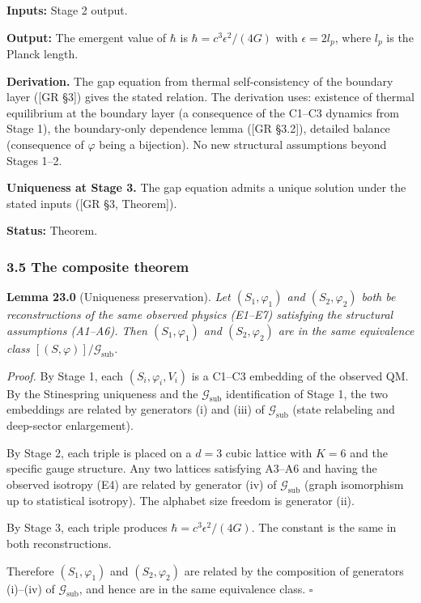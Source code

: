 \documentclass[
]{article}
\begin{document}
\textbf{Inputs:} Stage 2 output.

\textbf{Output:} The emergent value of \(\hbar\) is
\(\hbar = c^3 \epsilon^2 / (4G)\) with \(\epsilon = 2 l_p\), where
\(l_p\) is the Planck length.

\textbf{Derivation.} The gap equation from thermal self-consistency of
the boundary layer ({[}GR §3{]}) gives the stated relation. The
derivation uses: existence of thermal equilibrium at the boundary layer
(a consequence of the C1--C3 dynamics from Stage 1), the boundary-only
dependence lemma ({[}GR §3.2{]}), detailed balance (consequence of
\(\varphi\) being a bijection). No new structural assumptions beyond
Stages 1--2.

\textbf{Uniqueness at Stage 3.} The gap equation admits a unique
solution under the stated inputs ({[}GR §3, Theorem{]}).

\textbf{Status:} Theorem.

\hypertarget{the-composite-theorem}{%
\subsubsection{3.5 The composite theorem}\label{the-composite-theorem}}

\textbf{Lemma 23.0} (Uniqueness preservation). \emph{Let
\((S_1, \varphi_1)\) and \((S_2, \varphi_2)\) both be reconstructions of
the same observed physics (E1--E7) satisfying the structural assumptions
(A1--A6). Then \((S_1, \varphi_1)\) and \((S_2, \varphi_2)\) are in the
same equivalence class \([(S, \varphi)]/\mathcal{G}_{\text{sub}}\).}

\emph{Proof.} By Stage 1, each \((S_i, \varphi_i, V_i)\) is a C1--C3
embedding of the observed QM. By the Stinespring uniqueness and the
\(\mathcal{G}_{\text{sub}}\) identification of Stage 1, the two
embeddings are related by generators (i) and (iii) of
\(\mathcal{G}_{\text{sub}}\) (state relabeling and deep-sector
enlargement).

By Stage 2, each triple is placed on a \(d = 3\) cubic lattice with
\(K = 6\) and the specific gauge structure. Any two lattices satisfying
A3--A6 and having the observed isotropy (E4) are related by generator
(iv) of \(\mathcal{G}_{\text{sub}}\) (graph isomorphism up to
statistical isotropy). The alphabet size freedom is generator (ii).

By Stage 3, each triple produces \(\hbar = c^3 \epsilon^2 / (4G)\). The
constant is the same in both reconstructions.

Therefore \((S_1, \varphi_1)\) and \((S_2, \varphi_2)\) are related by
the composition of generators (i)--(iv) of \(\mathcal{G}_{\text{sub}}\),
and hence are in the same equivalence class. \(\square\)
\end{document}
